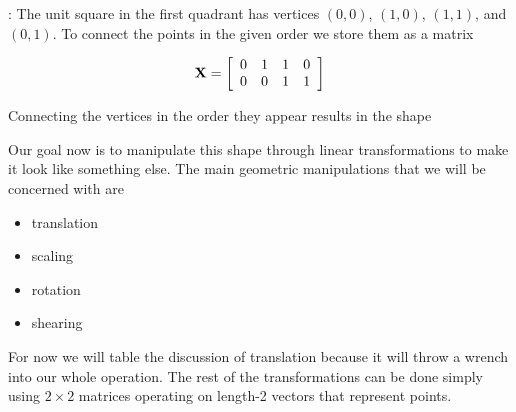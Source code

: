\documentclass[12pt]{article}
\newcommand{\nin}{\noindent}
\newcommand{\vthree}{\vspace{3mm}}
\newcommand{\myp}[1]{\left( #1 \right)}
\newcommand{\mymat}[1]{
\left[
\begin{array}{rrrrrrrrrrrrrrrrrrrrrrrrrrrrrrrrrrrrrrr}
#1
\end{array}
\right]
}
\begin{document}
\nin {\bf Example 1}:  The unit square in the first quadrant has vertices $\myp{0,0}$, $\myp{1,0}$, $\myp{1,1}$,  and $\myp{0,1}$. To connect the points in the given order we store them as a matrix

\[
{\bf X} =
\mymat{
0 & 1 & 1 & 0 \\
0 & 0 & 1 & 1 \\
}
\]

\vthree

\nin Connecting the vertices in the order they appear results in the shape


\begin{center}
\end{center}

\clearpage

\nin Our goal now is to manipulate this shape through linear transformations to make it look like something else.  The main geometric manipulations that we will be concerned with are

\begin{itemize}
\item translation
\item scaling
\item rotation
\item shearing
\end{itemize}

\vthree

\nin For now we will table the discussion of translation because it will throw a wrench into our whole operation.  The rest of the transformations can be done simply using $2 \times 2$ matrices operating on length-2 vectors that represent points.
\end{document}
